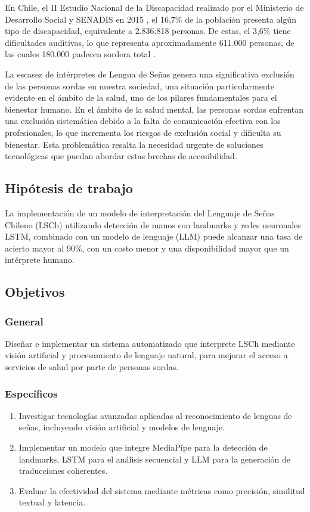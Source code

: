 \documentclass{article}
\begin{document}
En Chile, el II Estudio Nacional de la Discapacidad realizado por el Ministerio de Desarrollo Social y SENADIS en 2015 \cite{cita12}, el 16,7\% de la población presenta algún tipo de discapacidad, equivalente a 2.836.818 personas. De estas, el 3,6\% tiene dificultades auditivas, lo que representa aproximadamente 611.000 personas, de las cuales 180.000 padecen sordera total \cite{cita1}.

La escasez de intérpretes de Lengua de Señas genera una significativa exclusión de las personas sordas en nuestra sociedad, una situación particularmente evidente en el ámbito de la salud, uno de los pilares fundamentales para el bienestar humano.
En el ámbito de la salud mental, las personas sordas enfrentan una exclusión sistemática debido a la falta de comunicación efectiva con los profesionales, lo que incrementa los riesgos de exclusión social y dificulta su bienestar. Esta problemática resalta la necesidad urgente de soluciones tecnológicas que puedan abordar estas brechas de accesibilidad.

\subsection{Hipótesis de trabajo}

La implementación de un modelo de interpretación del Lenguaje de Señas Chileno (LSCh)
utilizando detección de manos con landmarks y redes neuronales LSTM, combinado con un
modelo de lenguaje (LLM) puede alcanzar una tasa de acierto mayor al 90\%, con un costo menor y una disponibilidad mayor que un intérprete humano.

\subsection{Objetivos}

\subsubsection{General}

Diseñar e implementar un sistema automatizado que interprete LSCh mediante visión artificial y procesamiento de lenguaje natural, para mejorar el acceso a servicios de salud por parte de personas sordas.


\subsubsection{Específicos}

\begin{enumerate}
    \item Investigar tecnologías avanzadas aplicadas al reconocimiento de lenguas de señas, incluyendo visión artificial y modelos de lenguaje.
    \item Implementar un modelo que integre MediaPipe para la detección de landmarks, LSTM para el análisis secuencial y LLM para la generación de traducciones coherentes.
    \item Evaluar la efectividad del sistema mediante métricas como precisión, similitud textual y latencia.
\end{enumerate}
\end{document}
